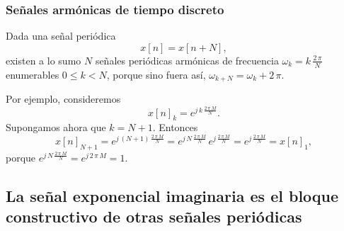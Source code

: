 \subsubsection{Señales armónicas de tiempo discreto}

Dada una se\~{n}al peri\'{o}dica
\begin{equation}
  x[n] = x[n + N],
\end{equation}
existen a lo sumo $N$ se\~{n}ales peri\'{o}dicas arm\'{o}nicas de frecuencia $\omega_{k} = k \, \frac{2 \, \pi}{N}$ 
enumerables $0 \leq k < N$, porque sino fuera así, $\omega_{k + N} = \omega_{k} + 2 \, \pi$.

Por ejemplo, consideremos
\begin{equation}
	x[n]_{k} = e^{j \, k \, \frac{2 \, \pi \, M}{N}}.
\end{equation}
Supongamos ahora que $k = N + 1$. Entonces
\begin{equation}
	x[n]_{N+1} = e^{j \, (N + 1) \, \frac{2 \, \pi \, M}{N}} = e^{j \, N \, \frac{2 \, \pi \, M}{N}} \, e^{j \, \frac{2 \, \pi \, M}{N}} = 
	e^{j \, \frac{2 \, \pi \, M}{N}} = x[n]_{1},
\end{equation}
porque $e^{j \, N \, \frac{2 \, \pi \, M}{N}} = e^{j \, 2 \, \pi \, M} = 1.$

\subsection{La se\~{n}al exponencial imaginaria es el bloque constructivo de otras se\~{n}ales peri\'{o}dicas}

